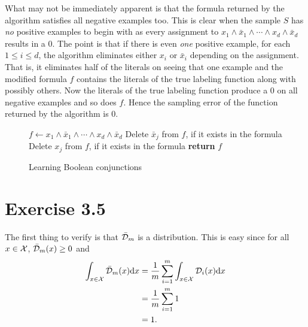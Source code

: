 What may not be immediately apparent is that the formula returned by the algorithm satisfies all negative examples too. This is clear when the sample $S$ has \emph{no} positive examples to begin with as every assignment to $x_1 \land \bar{x}_1 \land \cdots 
            \land x_d \land \bar{x}_d$ results in a $0$. The point is that if there is even \emph{one} positive example, for each $1 \leq i \leq d$, the algorithm eliminates either $x_i$ or $\bar{x}_i$ depending on the assignment. That is, it eliminates half of the literals on seeing that one example and the modified formula $f$ contains the literals of the true labeling function along with possibly others. 
Now the literals of the true labeling function produce a $0$ on all negative examples and so does $f$. Hence the sampling error of the function returned by the algorithm is $0$.   
\begin{figure}
    \begin{algorithmic}[0] %
            \State $f \gets x_1 \land \bar{x}_1 \land \cdots 
            \land x_d \land \bar{x}_d$
            			\State Delete $\bar{x}_j$ from $f$, if it exists in the formula
            		\Else
            			\State Delete $x_j$ from $f$, if it exists in the formula
            		\EndIf
             	\EndFor
            \EndFor
            \State \textbf{return} $f$
        \EndProcedure
    \end{algorithmic}
\caption{Learning Boolean conjunctions}
\label{fig:pac_boolean_conjunctions}
\end{figure}


\section*{Exercise 3.5}

The first thing to verify is that $\bar{\mathcal{D}}_m$ is a distribution. This is easy since for all $x \in \mathcal{X}$, $\bar{\mathcal{D}}_m(x) \geq 0$ and 
\begin{align*}
	\int_{x \in \mathcal{X}} \bar{\mathcal{D}}_m (x) \text{d} x & = \frac{1}{m} \sum_{i = 1}^m  
	\int_{x \in \mathcal{X}} \mathcal{D}_i (x) \text{d} x \\
	& = \frac{1}{m} \sum_{i = 1}^m 1 \\
	& = 1.
\end{align*}

